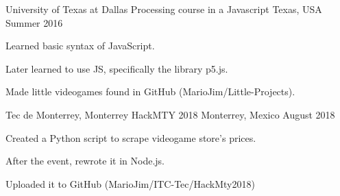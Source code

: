 

\begin{cventries}

  \cventry
    {University of Texas at Dallas} %
    {Processing course in a Javascript} %
    {Texas, USA} %
    {Summer 2016} %
    {
      \begin{cvitems} %
        \item {Learned basic syntax of JavaScript.}
        \item {Later learned to use JS, specifically the library p5.js.}
        \item {Made little videogames found in GitHub (MarioJim/Little-Projects).}
      \end{cvitems}
    }

  \cventry
    {Tec de Monterrey, Monterrey} %
    {HackMTY 2018} %
    {Monterrey, Mexico} %
    {August 2018} %
    {
      \begin{cvitems} %
        \item {Created a Python script to scrape videogame store's prices.}
        \item {After the event, rewrote it in Node.js.}
        \item {Uploaded it to GitHub (MarioJim/ITC-Tec/HackMty2018)}
      \end{cvitems}
    }

\end{cventries}
